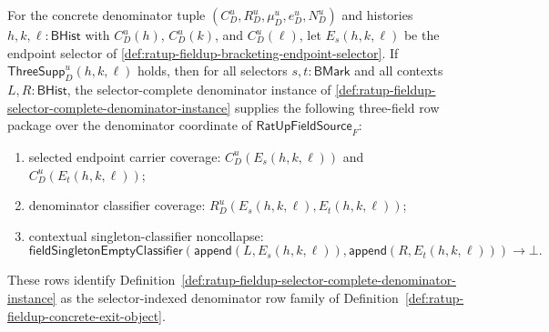 \begin{theorem}
\label{thm:ratup-fieldup-selector-complete-denominator-well-formed-exit-slice}
For the concrete denominator tuple $(C_D^u,R_D^u,\mu_D^u,e_D^u,N_D^u)$ and
histories $h,k,\ell:\mathsf{BHist}$ with $C_D^u(h)$, $C_D^u(k)$, and
$C_D^u(\ell)$, let $E_s(h,k,\ell)$ be the endpoint selector of
\autoref{def:ratup-fieldup-bracketing-endpoint-selector}. If
$\mathsf{ThreeSupp}_D^u(h,k,\ell)$ holds, then for all selectors
$s,t:\mathsf{BMark}$ and all contexts $L,R:\mathsf{BHist}$, the
selector-complete denominator instance of
\autoref{def:ratup-fieldup-selector-complete-denominator-instance} supplies
the following three-field row package over the denominator coordinate of
$\mathsf{RatUpFieldSource}_F$:
\begin{enumerate}
  \item selected endpoint carrier coverage:
  $C_D^u(E_s(h,k,\ell))$ and $C_D^u(E_t(h,k,\ell))$;
  \item denominator classifier coverage:
  $R_D^u(E_s(h,k,\ell),E_t(h,k,\ell))$;
  \item contextual singleton-classifier noncollapse:
  $$
  \mathsf{fieldSingletonEmptyClassifier}
  (\mathsf{append}(L,E_s(h,k,\ell)),\mathsf{append}(R,E_t(h,k,\ell)))\to\bot.
  $$
\end{enumerate}
These rows identify Definition~\ref{def:ratup-fieldup-selector-complete-denominator-instance}
as the selector-indexed denominator row family of
Definition~\ref{def:ratup-fieldup-concrete-exit-object}.
\end{theorem}
